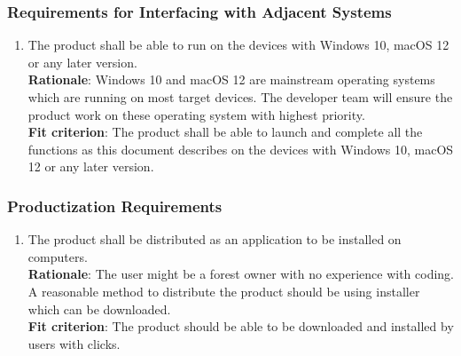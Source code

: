 \documentclass{article}
\begin{document}
\subsubsection{Requirements for Interfacing with Adjacent Systems}
\begin{enumerate}[OE2.1]
    \item The product shall be able to run on the devices with Windows 10, macOS 12 or any later version.\\
    \textbf{Rationale}: Windows 10 and macOS 12 are mainstream operating systems which are running on most target devices. The developer team will ensure the product work on these operating system with highest priority.\\
    \textbf{Fit criterion}: The product shall be able to launch and complete all the functions as this document describes on the devices with Windows 10, macOS 12 or any later version.\\
\end{enumerate}
\subsubsection{Productization Requirements}
\begin{enumerate}[OE3.1]
    \item The product shall be distributed as an application to be installed on computers.\\
    \textbf{Rationale}: The user might be a forest owner with no experience with coding. A reasonable method to distribute the product should be using installer which can be downloaded. \\
    \textbf{Fit criterion}: The product should be able to be downloaded and installed by users with clicks. \\
\end{enumerate}
\end{document}
